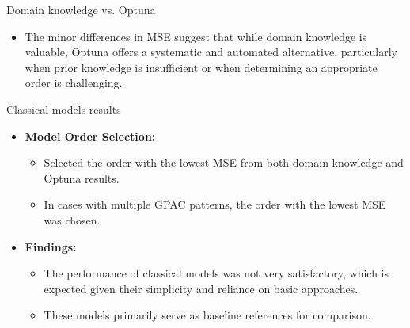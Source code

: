 \documentclass[aspectratio=16 9,10pt]{beamer}
\begin{document}
\begin{frame}{Domain knowledge vs. Optuna}
    \begin{itemize}
    \item The minor differences in MSE suggest that while domain knowledge is valuable, Optuna offers a systematic and automated alternative, particularly when prior knowledge is insufficient or when determining an appropriate order is challenging.
    \end{itemize}
\end{frame}



\begin{frame}{Classical models results}
    \begin{itemize}
        \item \textbf{Model Order Selection:}
        \begin{itemize}
            \item Selected the order with the lowest MSE from both domain knowledge and Optuna results.
            \item In cases with multiple GPAC patterns, the order with the lowest MSE was chosen.
        \end{itemize}

        \item \textbf{Findings:}
        \begin{itemize}
            \item The performance of classical models was not very satisfactory, which is expected given their simplicity and reliance on basic approaches.
            \item These models primarily serve as baseline references for comparison.
        \end{itemize}
    \end{itemize}
\end{frame}
\end{document}
